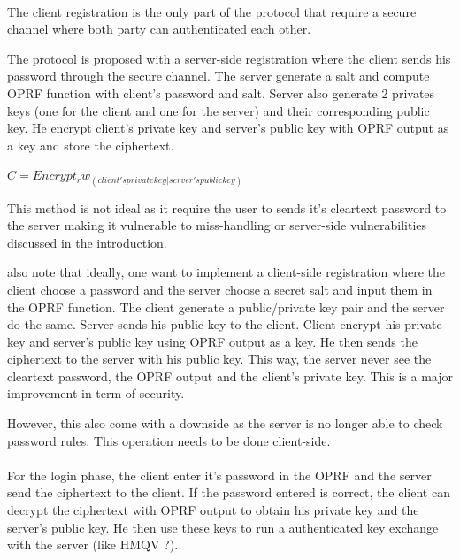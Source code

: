 \documentclass[../report.tex]{subfiles}
\begin{document}
\paragraph{} \label{sec:opaque_register}
The client registration is the only part of the protocol that require a secure channel where both party can authenticated each other.


The protocol is proposed with a server-side registration where the client sends his password through the secure channel. The server generate a salt and compute OPRF function with client's password and salt. Server also generate 2 privates keys (one for the client and one for the server) and their corresponding public key. He encrypt client's private key and server's public key with OPRF output as a key and store the ciphertext.


$C = Encrypt_rw_(client's private key | server's public key)$


This method is not ideal as it require the user to sends it's cleartext password to the server making it vulnerable to miss-handling or server-side vulnerabilities discussed in the introduction.



\cite{OPAQUE_Paper} also note that ideally, one want to implement a client-side registration where the client choose a password and the server choose a secret salt and input them in the OPRF function. The client generate a public/private key pair and the server do the same. Server sends his public key to the client. Client encrypt his private key and server's public key using OPRF output as a key. He then sends the ciphertext to the server with his public key.
This way, the server never see the cleartext password, the OPRF output and the client's private key. This is a major improvement in term of security.

However, this also come with a downside as the server is no longer able to check password rules. This operation needs to be done client-side.


\paragraph{}
For the login phase, the client enter it's password in the OPRF and the server send the ciphertext to the client.
If the password entered is correct, the client can decrypt the ciphertext with OPRF output to obtain his private key and the server's public key.
He then use these keys to run a authenticated key exchange with the server (like HMQV ?).
\end{document}
